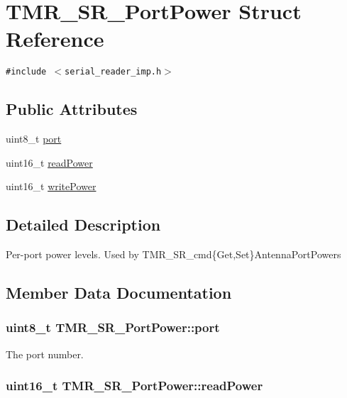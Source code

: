 \hypertarget{struct_t_m_r___s_r___port_power}{
\section{TMR\_\-SR\_\-PortPower Struct Reference}
\label{struct_t_m_r___s_r___port_power}
}
{\tt \#include $<$serial\_\-reader\_\-imp.h$>$}

\subsection*{Public Attributes}
\begin{CompactItemize}
\item 
uint8\_\-t \hyperlink{struct_t_m_r___s_r___port_power_8faacf37b2dc69aa0bab0aaaa8752f12}{port}
\item 
uint16\_\-t \hyperlink{struct_t_m_r___s_r___port_power_a858037aaad78b120e5e0f77d2c7dde5}{readPower}
\item 
uint16\_\-t \hyperlink{struct_t_m_r___s_r___port_power_b6bc633d14f5eb94000550c4f19c6193}{writePower}
\end{CompactItemize}


\subsection{Detailed Description}
Per-port power levels. Used by TMR\_\-SR\_\-cmd\{Get,Set\}AntennaPortPowers 

\subsection{Member Data Documentation}
\hypertarget{struct_t_m_r___s_r___port_power_8faacf37b2dc69aa0bab0aaaa8752f12}{
\subsubsection[{port}]{\setlength{\rightskip}{0pt plus 5cm}uint8\_\-t {\bf TMR\_\-SR\_\-PortPower::port}}}
\label{struct_t_m_r___s_r___port_power_8faacf37b2dc69aa0bab0aaaa8752f12}


The port number. \hypertarget{struct_t_m_r___s_r___port_power_a858037aaad78b120e5e0f77d2c7dde5}{
\subsubsection[{readPower}]{\setlength{\rightskip}{0pt plus 5cm}uint16\_\-t {\bf TMR\_\-SR\_\-PortPower::readPower}}}
\label{struct_t_m_r___s_r___port_power_a858037aaad78b120e5e0f77d2c7dde5}



